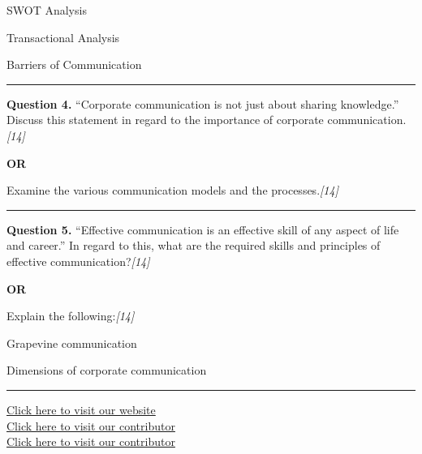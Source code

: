 \documentclass[11pt,a4paper]{article}
\newcommand{\pts}[1]{\hfill   \textit{[#1]}}
\begin{document}
\begin{parts}
  \item SWOT Analysis
  \item Transactional Analysis
  \item Barriers of Communication
\end{parts}

\medskip\rule{\linewidth}{0.2pt}




\noindent   \textbf{Question 4.}
``Corporate communication is not just about sharing knowledge.'' Discuss this statement in regard to the importance of corporate communication.\pts{14}

\centerline{   \textbf{OR}}

Examine the various communication models and the processes.\pts{14}

\medskip\rule{\linewidth}{0.2pt}




\noindent   \textbf{Question 5.}
``Effective communication is an effective skill of any aspect of life and career.'' In regard to this, what are the required skills and principles of effective communication?\pts{14}

\centerline{   \textbf{OR}}

Explain the following:\pts{14}

\begin{parts}
  \item Grapevine communication
  \item Dimensions of corporate communication
\end{parts}

\vfill
\rule{\linewidth}{0.4pt}

\begin{center}\small
\href{https://bhu-exam.vercel.app/}{Click here to visit our website}\\[4pt]
\href{https://me-aryan.vercel.app/}{Click here to visit our contributor}\\[4pt]
\href{https://quashan-me.vercel.app/}{Click here to visit our contributor}
\end{center}
\end{document}
